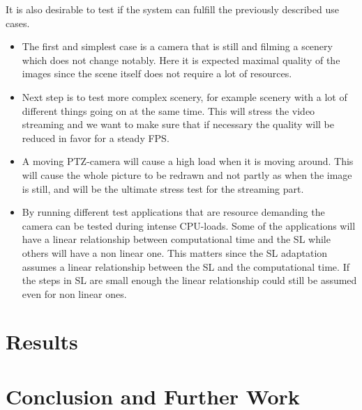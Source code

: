 \documentclass[nobiblatex]{LTHthesis}
\begin{document}
It is also desirable to test if the system can fulfill the previously described use cases.

\begin{itemize}

\item The first and simplest case is a camera that is still and filming a scenery which does not change notably. Here it is expected maximal quality of the images since the scene itself does not require a lot of resources. 
\item Next step is to test more complex scenery, for example scenery with a lot of different things going on at the same time. This will stress the video streaming and we want to make sure that if necessary the quality will be reduced in favor for a steady FPS.
\item A moving PTZ-camera will cause a high load when it is moving around. This will cause the whole picture to be redrawn and not partly as when the image is still, and will be the ultimate stress test for the streaming part.
\item By running different test applications that are resource demanding the camera can be tested during intense CPU-loads. Some of the applications will have a linear relationship between computational time and the SL while others will have a non linear one. This matters since the SL adaptation assumes a linear relationship between the SL and the computational time. If the steps in SL are small enough the linear relationship could still be assumed even for non linear ones.
\end{itemize}

\chapter{Results}
\label{chp:results}

\chapter{Conclusion and Further Work}
\label{chp:conclusion}





\end{document}
